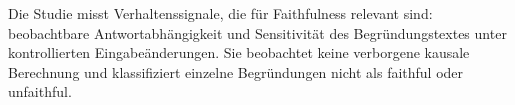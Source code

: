 \documentclass[
12pt,
oneside,
english,
onehalfspacing,
nolistspacing,
parskip,
headsepline,
]{MastersDoctoralThesis}
\begin{document}
{\begin{singlespace}
Die Studie misst Verhaltenssignale, die für Faithfulness relevant sind:
beobachtbare Antwortabhängigkeit und Sensitivität des Begründungstextes unter
kontrollierten Eingabeänderungen. Sie beobachtet keine verborgene kausale
Berechnung und klassifiziert einzelne Begründungen nicht als faithful oder
unfaithful.
\end{singlespace}
\vfill\null
}




\setcounter{tocdepth}{2}
{\fontsize{9}{10.5}\selectfont\tableofcontents}

\clearpage
{}
{}
{\small\listoffigures}

\clearpage
{}
{}
{\footnotesize\listoftables}

\end{document}

